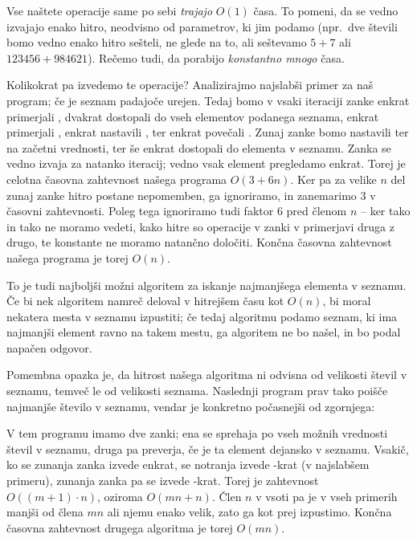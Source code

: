 Vse naštete operacije same po sebi \emph{trajajo} $O(1)$ časa.
To pomeni, da se vedno izvajajo enako hitro, neodvisno od parametrov, ki jim
podamo (npr.~dve števili bomo vedno enako hitro sešteli, ne glede na to, ali
seštevamo $5 + 7$ ali $123456+984621$).
Rečemo tudi, da porabijo \emph{konstantno mnogo} časa.

Kolikokrat pa izvedemo te operacije?
Analizirajmo najslabši primer za naš program; če je seznam  padajoče
urejen.
Tedaj bomo v vsaki iteraciji zanke enkrat primerjali , dvakrat
dostopali do vseh elementov podanega seznama, enkrat primerjali
, enkrat nastavili , ter enkrat
povečali .
Zunaj zanke bomo nastavili  ter  na začetni vrednosti, ter
še enkrat dostopali do elementa v seznamu.
Zanka se vedno izvaja za natanko  iteracij; vedno vsak element pregledamo
enkrat.
Torej je celotna časovna zahtevnost našega programa $O(3 + 6n)$.
Ker pa za velike $n$ del zunaj zanke hitro postane nepomemben, ga ignoriramo, in
zanemarimo $3$ v časovni zahtevnosti.
Poleg tega ignoriramo tudi faktor $6$ pred členom $n$ -- ker tako in tako ne moramo
vedeti, kako hitre so operacije v zanki v primerjavi druga z drugo, te konstante
ne moramo natančno določiti.
Končna časovna zahtevnost našega programa je torej $O(n)$.

To je tudi najboljši možni algoritem za iskanje najmanjšega elementa v seznamu.
Če bi nek algoritem namreč deloval v hitrejšem času kot $O(n)$, bi moral
nekatera mesta v seznamu izpustiti; če tedaj algoritmu podamo seznam, ki ima
najmanjši element ravno na takem mestu, ga algoritem ne bo našel, in bo podal
napačen odgovor.

Pomembna opazka je, da hitrost našega algoritma ni odvisna od velikosti števil
v seznamu, temveč le od velikosti seznama.
Naslednji program prav tako poišče najmanjše število v seznamu, vendar je
konkretno počasnejši od zgornjega:


V tem programu imamo dve zanki; ena se sprehaja po vseh možnih vrednosti števil
v seznamu, druga pa preverja, če je ta element dejansko v seznamu.
Vsakič, ko se zunanja zanka izvede enkrat, se notranja izvede -krat (v
najslabšem primeru), zunanja zanka pa se izvede -krat.
Torej je zahtevnost $O((m+1) \cdot n)$, oziroma $O(mn + n)$.
Člen $n$ v vsoti pa je v vseh primerih manjši od člena $mn$ ali njemu enako
velik, zato ga kot prej izpustimo.
Končna časovna zahtevnost drugega algoritma je torej $O(mn)$.


